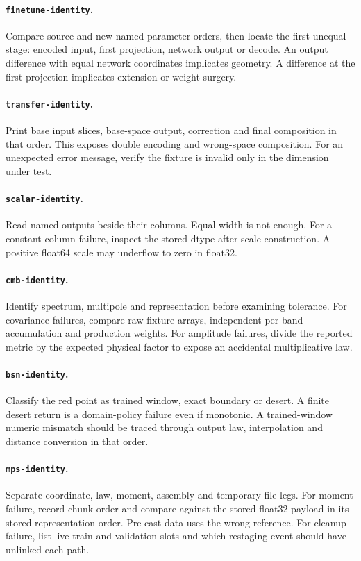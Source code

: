 \documentclass[10pt,aps,prd,twocolumn,nofootinbib]{revtex4-2}
\newcommand{\code}[1]{\texttt{#1}}
\begin{document}
\paragraph{\code{finetune-identity}.}
Compare source and new named parameter orders, then locate the first unequal
stage: encoded input, first projection, network output or decode.  An output
difference with equal network coordinates implicates geometry.  A difference
at the first projection implicates extension or weight surgery.

\paragraph{\code{transfer-identity}.}
Print base input slices, base-space output, correction and final composition
in that order.  This exposes double encoding and wrong-space composition.
For an unexpected error message, verify the fixture is invalid only in the
dimension under test.

\paragraph{\code{scalar-identity}.}
Read named outputs beside their columns.  Equal width is not enough.  For a
constant-column failure, inspect the stored dtype after scale construction.
A positive float64 scale may underflow to zero in float32.

\paragraph{\code{cmb-identity}.}
Identify spectrum, multipole and representation before examining tolerance.
For covariance failures, compare raw fixture arrays, independent per-band
accumulation and production weights.  For amplitude failures, divide the
reported metric by the expected physical factor to expose an accidental
multiplicative law.

\paragraph{\code{bsn-identity}.}
Classify the red point as trained window, exact boundary or desert.  A finite
desert return is a domain-policy failure even if monotonic.  A trained-window
numeric mismatch should be traced through output law, interpolation and
distance conversion in that order.

\paragraph{\code{mps-identity}.}
Separate coordinate, law, moment, assembly and temporary-file legs.  For
moment failure, record chunk order and compare against the stored float32
payload in its stored representation order.  Pre-cast data uses the wrong
reference.  For cleanup failure, list live train and
validation slots and which restaging event should have unlinked each path.
\end{document}
